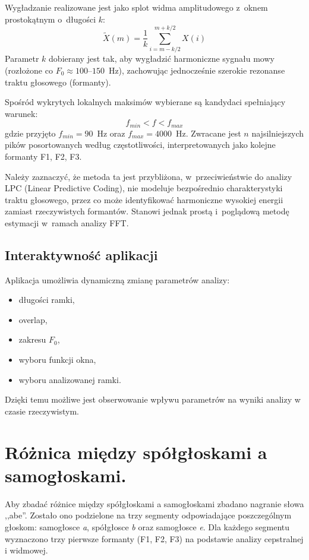 \documentclass[a4paper,12pt]{article}
\begin{document}
Wygładzanie realizowane jest jako splot widma amplitudowego z~oknem prostokątnym 
o~długości $k$:
\[
\tilde{X}(m) = \frac{1}{k} \sum_{i=m-k/2}^{m+k/2} X(i)
\]
Parametr $k$ dobierany jest tak, aby wygładzić harmoniczne sygnału mowy 
(rozłożone co $F_0 \approx 100$--$150$~Hz), zachowując jednocześnie szerokie 
rezonanse traktu głosowego (formanty).

Spośród wykrytych lokalnych maksimów wybierane są kandydaci spełniający warunek:
\[
f_{min} < f < f_{max}
\]
gdzie przyjęto $f_{min} = 90$~Hz oraz $f_{max} = 4000$~Hz. Zwracane jest 
$n$ najsilniejszych pików posortowanych według częstotliwości, interpretowanych 
jako kolejne formanty F1, F2, F3.

Należy zaznaczyć, że metoda ta jest przybliżona, w~przeciwieństwie do analizy 
LPC (Linear Predictive Coding), nie modeluje bezpośrednio charakterystyki traktu 
głosowego, przez co może identyfikować harmoniczne wysokiej energii zamiast 
rzeczywistych formantów. Stanowi jednak prostą i~poglądową metodę estymacji 
w~ramach analizy FFT.

\subsection{Interaktywność aplikacji}

Aplikacja umożliwia dynamiczną zmianę parametrów analizy:

\begin{itemize}
	\item długości ramki,
	\item overlap,
	\item zakresu $F_0$,
	\item wyboru funkcji okna,
	\item wyboru analizowanej ramki.
\end{itemize}

Dzięki temu możliwe jest obserwowanie wpływu parametrów na wyniki analizy w czasie rzeczywistym.

\section{Różnica między spółgłoskami a samogłoskami.}
Aby zbadać różnice między spółgłoskami a samogłoskami zbadano nagranie słowa ,,abe''. Zostało ono podzielone na trzy segmenty odpowiadające poszczególnym głoskom: samogłosce \textit{a}, spółgłosce \textit{b} oraz samogłosce \textit{e}. Dla każdego segmentu wyznaczono trzy pierwsze formanty (F1, F2, F3) na podstawie analizy cepstralnej i widmowej.
\end{document}
